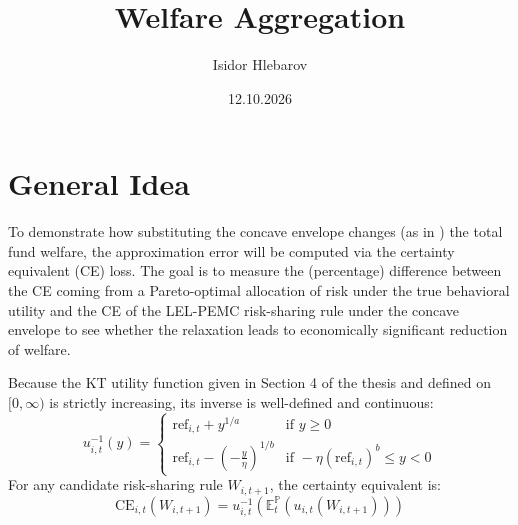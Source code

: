 \documentclass[11pt,a4paper]{article}
\title{\textbf{Welfare Aggregation}}
\author{Isidor Hlebarov}
\date{12.10.2026}
\theoremstyle{definition}
\theoremstyle{plain}
\theoremstyle{remark}
\newcommand{\E}{\mathbb{E}}
\renewcommand{\P}{\mathbb{P}}
\newcommand{\1}{\mathbf{1}}
\begin{document}
\maketitle

\section{General Idea}
\label{Sect:General_Idea}
To demonstrate how substituting the concave envelope changes (as in \citet{Dong2020}) the total fund welfare, the approximation error will be computed via the certainty equivalent (CE) loss. The goal is to measure the (percentage) difference between the CE coming from a Pareto-optimal allocation of risk under the true behavioral utility and the CE of the LEL-PEMC risk-sharing rule under the concave envelope to see whether the relaxation leads to economically significant reduction of welfare.

Because the KT utility function given in Section 4 of the thesis and defined on $[0, \infty)$ is strictly increasing, its inverse is well-defined and continuous:
\begin{equation*}
    u_{i,t}^{-1}(y) = \begin{cases} \text{ref}_{i,t} + y^{1/a} & \text{if } y \geq 0 \\ \text{ref}_{i,t} - \left( -\frac{y}{\eta} \right)^{1/b} & \text{if } -\eta (\text{ref}_{i,t})^b \leq y < 0 \end{cases}
\end{equation*}
For any candidate risk-sharing rule $W_{i,t+1}$, the certainty equivalent is:
\begin{equation*}
    \text{CE}_{i,t}(W_{i,t+1}) = u_{i,t}^{-1}(\E_t^{\P}(u_{i,t}(W_{i,t+1})))
\end{equation*}
\end{document}
